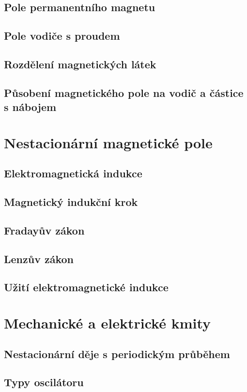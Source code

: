 \documentclass[titlepage]{book}
\begin{document}
\section{Pole permanentního magnetu}

\section{Pole vodiče s proudem}

\section{Rozdělení magnetických látek}

\section{Působení magnetického pole na vodič a částice s nábojem}

\chapter{Nestacionární magnetické pole}
\section{Elektromagnetická indukce}
\section{Magnetický indukční krok}
\section{Fradayův zákon}
\section{Lenzův zákon}
\section{Užití elektromagnetické indukce}
\chapter{Mechanické a elektrické kmity}
\section{Nestacionární děje s periodickým průběhem}
\section{Typy oscilátoru}
\end{document}
